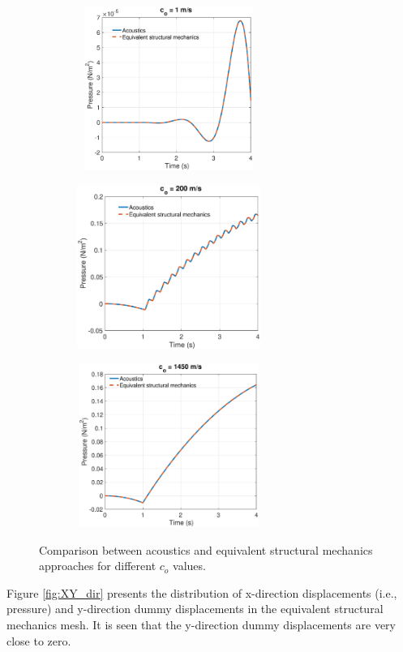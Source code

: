 \documentclass[3p]{elsarticle}
\begin{document}
\begin{figure}[H]
\begin{subfigure}{0.5\textwidth}
\centering
\includegraphics[width=2.5in, height=2.1in]{C_1.eps} 
\caption{}
\label{fig:C1}
\end{subfigure}
\begin{subfigure}{0.5\textwidth}
\centering
\includegraphics[width=2.5in, height=2.1in]{C_200.eps} 
\caption{}
\label{fig:C200}
\end{subfigure}
\begin{subfigure}{1\textwidth}
\centering
\includegraphics[width=2.5in, height=2.1in]{C_1450.eps} 
\caption{}
\label{fig:C1450}
\end{subfigure}
\caption{Comparison between acoustics and equivalent structural mechanics approaches for different $c_o$ values.}
\label{fig:Comparison}
\end{figure}

\noindent Figure \ref{fig:XY_dir} presents the distribution of x-direction displacements (i.e., pressure) and y-direction dummy displacements in the equivalent structural mechanics mesh. It is seen that the y-direction dummy displacements are very close to zero.
\end{document}
